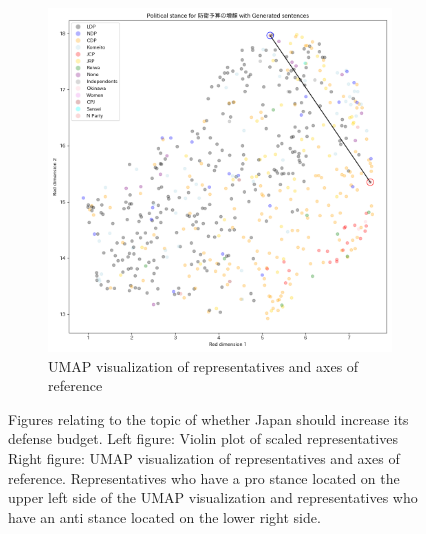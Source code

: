 \documentclass[final,5p,times,twocolumn,authoryear]{elsarticle}
\begin{document}
\begin{figure}[h]
\begin{subfigure}{0.22\textwidth}
      \includegraphics[width=1\linewidth]{figs/results/defence/防衛予算の増額_umap_gen.png}
      \caption{UMAP visualization of representatives and axes of reference}
    \end{subfigure}
\caption{Figures relating to the topic of whether Japan should increase its defense budget.
Left figure: Violin plot of scaled representatives
Right figure: UMAP visualization of representatives and axes of reference. Representatives who have a pro stance located on the upper left side of the UMAP visualization and representatives who have an anti stance located on the lower right side.}
\label{fig: results-defence-budget}
\end{figure}
\end{document}
